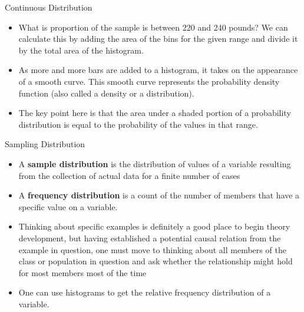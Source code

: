 \documentclass[
  ignorenonframetext,
]{beamer}
\begin{document}
\begin{frame}{Continuous Distribution}
\protect\hypertarget{continuous-distribution-1}{}

\begin{itemize}
\item
  What is proportion of the sample is between 220 and 240 pounds? We can
  calculate this by adding the area of the bins for the given range and
  divide it by the total area of the histogram.
\item
  As more and more bars are added to a histogram, it takes on the
  appearance of a smooth curve. This smooth curve represents the
  probability density function (also called a density or a
  distribution).
\item
  The key point here is that the area under a shaded portion of a
  probability distribution is equal to the probability of the values in
  that range.
\end{itemize}

\end{frame}

\begin{frame}{Sampling Distribution}
\protect\hypertarget{sampling-distribution}{}

\begin{itemize}
\item
  A \textbf{sample distribution} is the distribution of values of a
  variable resulting from the collection of actual data for a finite
  number of cases
\item
  A \textbf{frequency distribution} is a count of the number of members
  that have a specific value on a variable.
\item
  Thinking about specific examples is definitely a good place to begin
  theory development, but having established a potential causal relation
  from the example in question, one must move to thinking about all
  members of the class or population in question and ask whether the
  relationship might hold for most members most of the time
\item
  One can use histograms to get the relative frequency distribution of a
  variable.
\end{itemize}

\end{frame}
\end{document}
